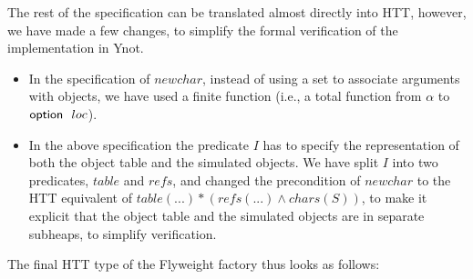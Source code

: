 The rest of the specification can be translated almost directly into HTT,
however, we have made a few changes, to simplify the formal verification of the
implementation in Ynot. 
\begin{itemize}
\item In the specification of $newchar$, instead of using a set to associate
arguments with objects, we have used a finite function (i.e., a total function
from $\alpha$ to $\mbox{\textsf{{option }}}{\ }loc$).
\item In the above specification the predicate $I$ has to specify the
representation of both the object table and the simulated objects. We have
split $I$ into two predicates, $table$ and $refs$, and changed the precondition
of $newchar$ to the HTT equivalent of $table(...) * (refs(...) \land
chars(S))$, to make it explicit that the object table and the simulated objects
are in separate subheaps, to simplify verification.
\end{itemize}
The final HTT type of the Flyweight factory thus looks as follows:
